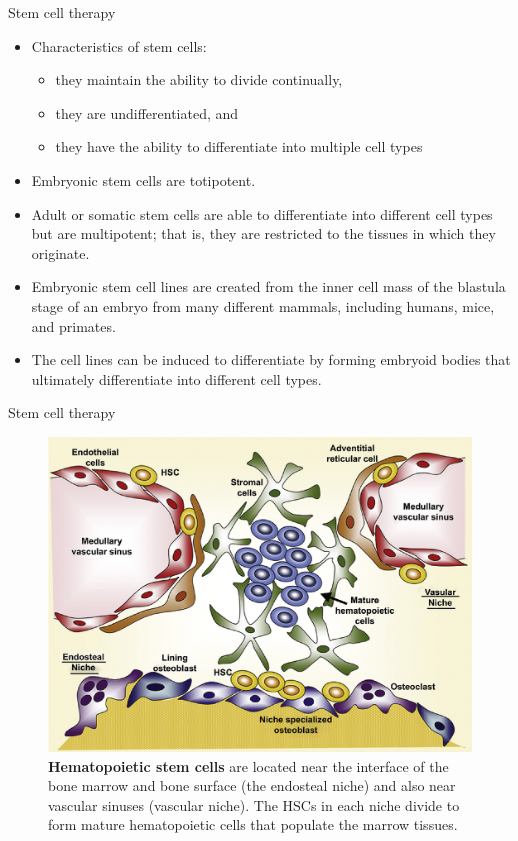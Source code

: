 \documentclass[
  ignorenonframetext,
  aspectratio=169]{beamer}
\providecommand{\tightlist}{%
  \setlength{\itemsep}{0pt}\setlength{\parskip}{0pt}}
\begin{document}
\begin{frame}{Stem cell therapy}
\protect\hypertarget{stem-cell-therapy}{}
\begin{itemize}
\tightlist
\item
  Characteristics of stem cells:

  \begin{itemize}
  \tightlist
  \item
    they maintain the ability to divide continually,
  \item
    they are undifferentiated, and
  \item
    they have the ability to differentiate into multiple cell types
  \end{itemize}
\item
  Embryonic stem cells are totipotent.
\item
  Adult or somatic stem cells are able to differentiate into different
  cell types but are multipotent; that is, they are restricted to the
  tissues in which they originate.
\item
  Embryonic stem cell lines are created from the inner cell mass of the
  blastula stage of an embryo from many different mammals, including
  humans, mice, and primates.
\item
  The cell lines can be induced to differentiate by forming embryoid
  bodies that ultimately differentiate into different cell types.
\end{itemize}
\end{frame}

\begin{frame}{Stem cell therapy}
\protect\hypertarget{stem-cell-therapy-1}{}
\begin{figure}
\includegraphics[width=0.45\linewidth]{../images/hematopoietic_stem_cells} \caption{\textbf{Hematopoietic stem cells} are located near the interface of the bone marrow and bone surface (the endosteal niche) and also near vascular sinuses (vascular niche). The HSCs in each niche divide to form mature hematopoietic cells that populate the marrow tissues.}\label{fig:stem-cell-therapy}
\end{figure}
\end{frame}
\end{document}
